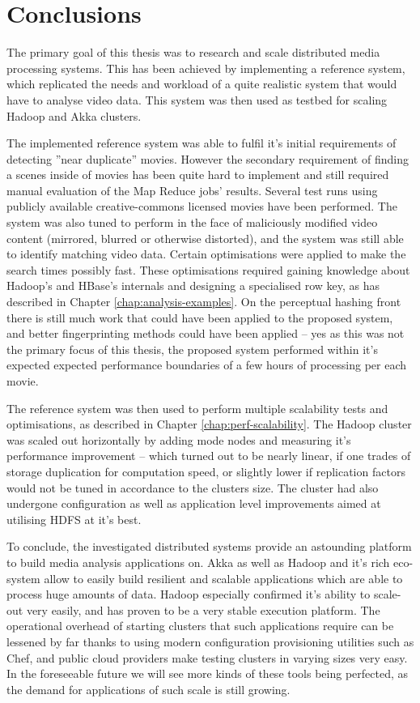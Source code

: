 \chapter{Conclusions}
\label{chap:conclusions}

The primary goal of this thesis was to research and scale distributed media processing systems. This has been achieved by implementing a reference system, which replicated the needs and workload of a quite realistic system that would have to analyse video data. This system was then used as testbed for scaling Hadoop and Akka clusters.

The implemented reference system was able to fulfil it's initial requirements of detecting ''near duplicate'' movies. 
However the secondary requirement of finding a scenes inside of movies has been quite hard to implement and still required manual evaluation of the Map Reduce jobs' results. Several test runs using publicly available creative-commons licensed movies have been performed. The system was also tuned to perform in the face of maliciously modified video content (mirrored, blurred or otherwise distorted), and the system was still able to identify matching video data. Certain optimisations were applied to make the search times possibly fast. These optimisations required gaining knowledge about Hadoop's and HBase's internals and designing a specialised row key, as has described in Chapter \ref{chap:analysis-examples}. On the perceptual hashing front there is still much work that could have been applied to the proposed system, and better fingerprinting methods could have been applied -- yes as this was not the primary focus of this thesis, the proposed system performed within it's expected expected performance boundaries of a few hours of processing per each movie.

The reference system was then used to perform multiple scalability tests and optimisations, as described in Chapter \ref{chap:perf-scalability}. The Hadoop cluster was scaled out horizontally by adding mode nodes and measuring it's performance improvement -- which turned out to be nearly linear, if one trades of storage duplication for computation speed, or slightly lower if replication factors would not be tuned in accordance to the clusters size. The cluster had also undergone configuration as well as application level improvements aimed at utilising HDFS at it's best.

To conclude, the investigated distributed systems provide an astounding platform to build media analysis applications on. Akka as well as Hadoop and it's rich eco-system allow to easily build resilient and scalable applications which are able to process huge amounts of data. Hadoop especially confirmed it's ability to scale-out very easily, and has proven to be a very stable execution platform. The operational overhead of starting clusters that such applications require can be lessened by far thanks to using modern configuration provisioning utilities such as Chef, and public cloud providers make testing clusters in varying sizes very easy. In the foreseeable future we will see more kinds of these tools being perfected, as the demand for applications of such scale is still growing.